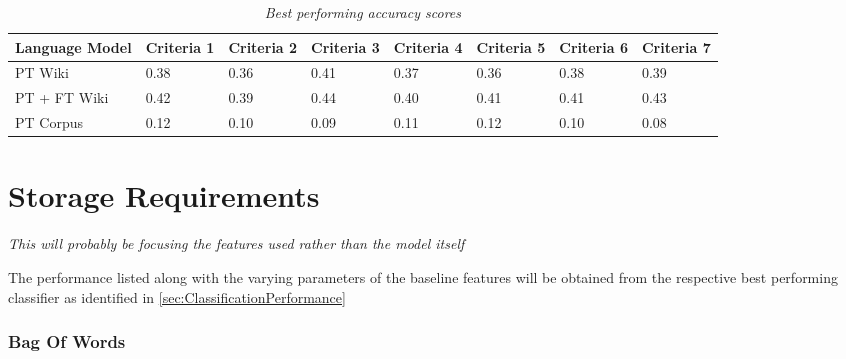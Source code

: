 \documentclass[a4paper,twoside,phd]{BYUPhys}
\begin{document}
\begin{table}[H]
	\centering
	\begin{tabular}{|p{1.7cm}|p{1.65cm}|p{1.65cm}|p{1.6cm}|p{1.65cm}|p{1.65cm}|p{1.65cm}|p{1.65cm}|}
		\hline
		Language Model & Criteria 1                                                                           & Criteria 2    & Criteria 3 & Criteria 4 & Criteria 5 & Criteria 6 & Criteria 7                                                                                                                                                                                                                                                                                                                                                          \\
		\hline       
		
		
		PT Wiki  & 0.38 & 0.36 & 0.41 & 0.37 & 0.36  & 0.38  & 0.39  \\
		\hline
		
		PT + FT Wiki  & 0.42 & 0.39 & 0.44 & 0.40 & 0.41 & 0.41  & 0.43   \\
		\hline
		
		PT Corpus  & 0.12 & 0.10 & 0.09 & 0.11 & 0.12  & 0.10 & 0.08\\
		\hline
		
		
		
	\end{tabular}
	\caption{\textit{Best performing accuracy scores}}
	\label{table:DLPerformance}
\end{table}

\section{Storage Requirements}
\label{sec:BaselineStorageRequirements}

\textit{This will probably be focusing the features used rather than the model itself}

The performance listed along with the varying parameters of the baseline features will be obtained from the respective best performing classifier as identified in \ref{sec:ClassificationPerformance}

\subsubsection{Bag Of Words}
\label{sec:BoWStorageRequirements}
\end{document}
